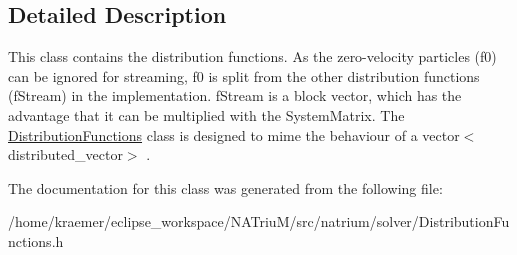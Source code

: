 \subsection{Detailed Description}
This class contains the distribution functions. As the zero-\/velocity particles (f0) can be ignored for streaming, f0 is split from the other distribution functions (f\-Stream) in the implementation. f\-Stream is a block vector, which has the advantage that it can be multiplied with the System\-Matrix. The \hyperlink{classnatrium_1_1DistributionFunctions}{Distribution\-Functions} class is designed to mime the behaviour of a vector$<$distributed\-\_\-vector$>$ . 

The documentation for this class was generated from the following file\-:\begin{DoxyCompactItemize}
\item 
/home/kraemer/eclipse\-\_\-workspace/\-N\-A\-Triu\-M/src/natrium/solver/Distribution\-Functions.\-h\end{DoxyCompactItemize}
